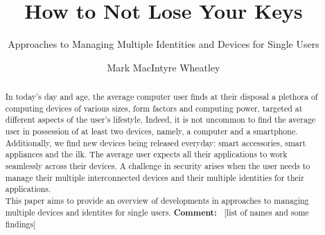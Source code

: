 \documentclass[sigconf]{acmart}
\def\comment#1{{\color{blue}\textbf{Comment:~} #1}}
\begin{document}
\title{How to Not Lose Your Keys}
\subtitle{Approaches to Managing Multiple Identities and Devices for Single Users}


\author{Mark MacIntyre Wheatley}

\begin{abstract}

In today's day and age, the average computer user finds at their disposal a plethora of computing devices of various sizes, form factors and computing power, targeted at different aspects of the user's lifestyle. Indeed, it is not uncommon to find the average user in possession of at least two devices, namely, a computer and a smartphone. Additionally, we find new devices being released everyday: smart accessories, smart appliances and the ilk. The average user expects all their applications to work seamlessly across their devices. A challenge in security arises when the user needs to manage their multiple interconnected devices and their multiple identities for their applications.\\
This paper aims to provide an overview of developments in approaches to managing multiple devices and identites for single users. \comment{[list of names and some findings]}

\end{abstract}


\maketitle





 
\end{document}

